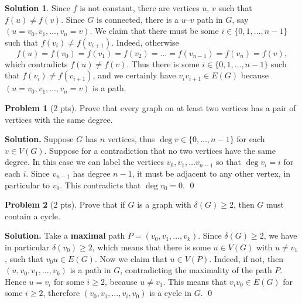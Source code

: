 \documentclass[11pt]{scrartcl}
\theoremstyle{definition}
\newtheorem{problem}{Problem}
\newtheorem{Solution}{Solution}
\newenvironment{solution}{\noindent\textbf{Solution.}}{\qed}
\begin{document}
\begin{Solution}
Since $f$ is not constant, there are vertices $u$, $v$ such that $f(u)\neq f(v)$. Since $G$ is connected, there is a $u$--$v$ path in $G$, say $(u=v_0, v_1, \dots, v_n=v)$. We claim that there must be some $i\in \{0, 1,\dots, n-1\}$ such that $f(v_i)\neq f(v_{i+1})$. Indeed, otherwise
\[f(u)=f(v_0)=f(v_1)=f(v_2)=\dots=f(v_{n-1})=f(v_n)=f(v),\] 
which contradicts $f(u)\neq f(v)$. Thus there is some $i\in \{0, 1,\dots, n-1\}$ such that $f(v_i)\neq f(v_{i+1})$, and we certainly have $v_iv_{i+1} \in E(G)$ because $(u=v_0, v_1, \dots, v_n=v)$ is a path.
\end{Solution}

\hrulefill

\begin{problem}[2 pts]
	Prove that every graph on at least two vertices has a pair of vertices with the same degree.
\end{problem}
\begin{solution}
Suppose $G$ has $n$ vertices, thus $\deg v \in \{0, \dots, n-1\}$ for each $v\in V(G)$. Suppose for a contradiction that no two vertices have the same degree. In this case we can label the vertices $v_0, v_1, \dots v_{n-1}$ so that $\deg v_i = i$ for each $i$. Since $v_{n-1}$ has degree $n-1$, it must be adjacent to any other vertex, in particular to $v_0$. This contradicts that $\deg v_0=0$.
\end{solution}

\hrulefill

\begin{problem}[2 pts]
	Prove that if $G$ is a graph with $\delta(G)\geq 2$, then $G$ must contain a cycle.
\end{problem}
\begin{solution}
Take a \textbf{maximal} path $P=(v_0, v_1, \dots, v_k)$. Since $\delta(G)\geq 2$, we have in particular $\delta(v_0)\geq 2$, which means that there is some $u\in V(G)$ with $u\ne v_1$, such that $v_0u\in E(G)$. Now we claim that $u\in V(P)$. Indeed, if not, then $(u,v_0, v_1, \dots, v_k)$ is a path in $G$, contradicting the maximality of the path $P$. Hence $u=v_i$ for some $i\geq2$, because $u\ne v_1$. This means that $v_i v_0 \in E(G)$ for some $i\geq 2$, therefore $(v_0, v_1, \dots, v_i,v_0)$ is a cycle in $G$.
\end{solution}

\hrulefill
\end{document}
